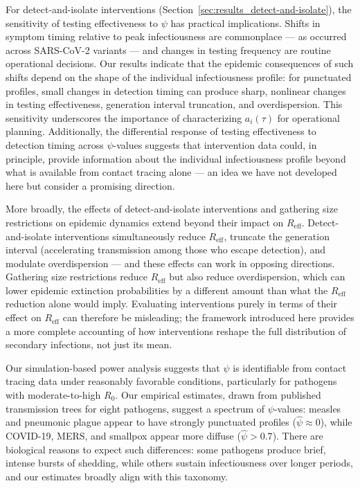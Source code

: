 For detect-and-isolate interventions (Section~\ref{sec:results_detect-and-isolate}), the sensitivity of testing effectiveness to $\psi$ has practical implications. Shifts in symptom timing relative to peak infectiousness are commonplace --- as occurred across SARS-CoV-2 variants --- and changes in testing frequency are routine operational decisions. Our results indicate that the epidemic consequences of such shifts depend on the shape of the individual infectiousness profile: for punctuated profiles, small changes in detection timing can produce sharp, nonlinear changes in testing effectiveness, generation interval truncation, and overdispersion. This sensitivity underscores the importance of characterizing $a_i(\tau)$ for operational planning. Additionally, the differential response of testing effectiveness to detection timing across $\psi$-values suggests that intervention data could, in principle, provide information about the individual infectiousness profile beyond what is available from contact tracing alone --- an idea we have not developed here but consider a promising direction.

More broadly, the effects of detect-and-isolate interventions and gathering size restrictions on epidemic dynamics extend beyond their impact on $R_\text{eff}$. Detect-and-isolate interventions simultaneously reduce $R_\text{eff}$, truncate the generation interval (accelerating transmission among those who escape detection), and modulate overdispersion --- and these effects can work in opposing directions. Gathering size restrictions reduce $R_\text{eff}$ but also reduce overdispersion, which can lower epidemic extinction probabilities by a different amount than what the $R_\text{eff}$ reduction alone would imply. Evaluating interventions purely in terms of their effect on $R_\text{eff}$ can therefore be misleading; the framework introduced here provides a more complete accounting of how interventions reshape the full distribution of secondary infections, not just its mean.

Our simulation-based power analysis suggests that $\psi$ is identifiable from contact tracing data under reasonably favorable conditions, particularly for pathogens with moderate-to-high $R_0$. Our empirical estimates, drawn from published transmission trees for eight pathogens, suggest a spectrum of $\psi$-values: measles and pneumonic plague appear to have strongly punctuated profiles ($\hat{\psi} \approx 0$), while COVID-19, MERS, and smallpox appear more diffuse ($\hat{\psi} > 0.7$). There are biological reasons to expect such differences: some pathogens produce brief, intense bursts of shedding, while others sustain infectiousness over longer periods, and our estimates broadly align with this taxonomy.


